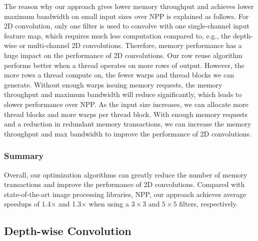 The reason why our approach gives lower memory throughput and achieves lower maximum bandwidth on small input sizes over NPP is explained
as follows. For 2D convolution, only one filter is used to convolve with one single-channel input feature map, which
requires much less computation compared to, e.g., the depth-wise or multi-channel 2D convolutions. Therefore, memory performance has a huge
impact on the performance of 2D convolutions. Our row reuse algorithm performs better when a thread operates on more rows of output.
However, the more rows a thread compute on, the fewer warps and thread blocks we can generate. Without enough warps issuing memory
requests, the memory throughput and maximum bandwidth will reduce significantly, which leads to slower performance over NPP. As the input
size increases, we can allocate more thread blocks and more warps per thread block. With enough memory requests and a reduction in redundant
memory transactions, we can increase the memory throughput and max bandwidth to improve the performance of 2D convolutions.

\subsubsection{Summary} Overall, our optimization algorithms can greatly reduce the number of memory transactions and improve the performance of 2D
convolutions. Compared with state-of-the-art image processing libraries, NPP, our approach achieves average speedups of 1.4$\times$ and
1.3$\times$ when using a $3 \times 3$ and $5 \times 5$ filters, respectively.

\subsection{Depth-wise Convolution}
\label{sec:depconvexp}

